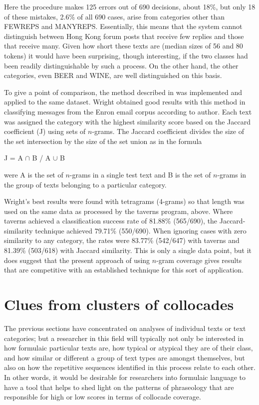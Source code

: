 \documentclass[output=paper]{langscibook}
\begin{document}
Here the procedure makes 125 errors out of 690 decisions, about 18\%, but only 18 of these mistakes, 2.6\% of all 690 cases, arise from categories other than FEWREPS and MANYREPS. Essentially, this means that the system cannot distinguish between Hong Kong forum posts that receive few replies and those that receive many. Given how short these texts are (median sizes of 56 and 80 tokens) it would have been surprising, though interesting, if the two classes had been readily distinguishable by such a process. On the other hand, the other categories, even BEER and WINE, are well distinguished on this basis.

To give a point of comparison, the method described in \citet{Wright2017} was implemented and applied to the same dataset. Wright obtained good results with this method in classifying messages from the Enron email corpus \citep{Cohen2009} according to author. Each text was assigned the category with the highest similarity score based on the Jaccard coefficient (J) using sets of $n$-grams. The Jaccard coefficient divides the size of the set intersection by the size of the set union as in the formula

\ea
  J = {\textbar}A ${\cap}$ B{\textbar} / {\textbar}A ${\cup}$ B{\textbar}
\z

were A is the set of $n$-grams in a single test text and B is the set of $n$-grams in the group of texts belonging to a particular category.

Wright's best results were found with tetragrams (4-grams) so that length was used on the same data as processed by the taverns program, above. Where taverns achieved a classification success rate of 81.88\% (565/690), the Jaccard-similarity technique achieved 79.71\% (550/690). When ignoring cases with zero similarity to any category, the rates were 83.77\% (542/647) with taverns and 81.39\% (503/618) with Jaccard similarity. This is only a single data point, but it does suggest that the present approach of using $n$-gram coverage gives results that are competitive with an established technique for this sort of application.

\section{Clues from clusters of collocades}

The previous sections have concentrated on analyses of individual texts or text categories; but a researcher in this field will typically not only be interested in how formulaic particular texts are, how typical or atypical they are of their class, and how similar or different a group of text types are amongst themselves, but also on how the repetitive sequences identified in this process relate to each other. In other words, it would be desirable for researchers into formulaic language to have a tool that helps to shed light on the patterns of phraseology that are responsible for high or low scores in terms of collocade coverage.
\end{document}
